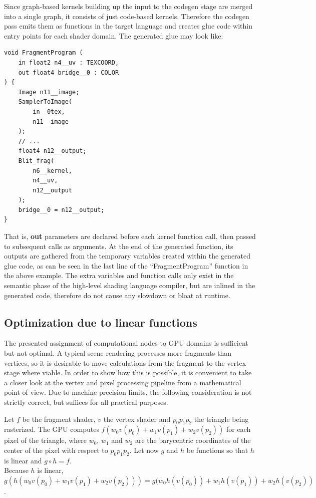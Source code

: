 Since graph-based kernels building up the input to the codegen stage are merged into a single graph, it consists of just code-based kernels. Therefore the codegen pass emits them as functions in the target language and creates glue code within entry points for each shader domain. The generated glue may look like:

\noindent\begin{minipage}{\textwidth}
\begin{lstlisting}[frame=single]
void FragmentProgram (
	in float2 n4__uv : TEXCOORD,
	out float4 bridge__0 : COLOR
) {
	Image n11__image;
	SamplerToImage(
		in__0tex,
		n11__image
	);
	// ...
	float4 n12__output;
	Blit_frag(
		n6__kernel,
		n4__uv,
		n12__output
	);
	bridge__0 = n12__output;
}
\end{lstlisting}
\end{minipage}

That is, \textbf{out} parameters are declared before each kernel function call, then passed to subsequent calls as arguments. At the end of the generated function, its outputs are gathered from the temporary variables created within the generated glue code, as can be seen in the last line of the ``FragmentProgram'' function in the above example. The extra variables and function calls only exist in the semantic phase of the high-level shading language compiler, but are inlined in the generated code, therefore do not cause any slowdown or bloat at runtime.

\subsection{Optimization due to linear functions}

The presented assignment of computational nodes to GPU domains is sufficient but not optimal. A typical scene rendering processes more fragments than vertices, so it is desirable to move calculations from the fragment to the vertex stage where viable. In order to show how this is possible, it is convenient to take a closer look at the vertex and pixel processing pipeline from a mathematical point of view. Due to machine precision limits, the following consideration is not strictly correct, but suffices for all practical purposes.

Let $f$ be the fragment shader, $v$ the vertex shader and $p_0 p_1 p_2$ the triangle being rasterized. The GPU computes $f(w_0 v(p_0) + w_1 v(p_1) + w_2 v(p_2))$ for each pixel of the triangle, where $w_0$, $w_1$ and $w_2$ are the barycentric coordinates of the center of the pixel with respect to $p_0 p_1 p_2$. Let now $g$ and $h$ be functions so that $h$ is linear and $g \circ h = f$. \\
Because $h$ is linear, \\
$g(h(w_0 v(p_0) + w_1 v(p_1) + w_2 v(p_2))) = g(w_0 h(v(p_0)) + w_1 h(v(p_1)) + w_2 h(v(p_2))$.

